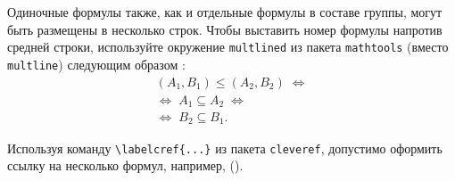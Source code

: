 Одиночные формулы также, как и отдельные формулы в составе группы, могут быть размещены в несколько строк. Чтобы выставить номер формулы напротив средней строки, используйте окружение \verb|multlined| из пакета \verb|mathtools| (вместо \verb|multline|) следующим образом \cite{Ganter1999}:
\begin{equation} %
\label{eq:fConcept-order-G}
\begin{multlined}
(A_1,B_1)\leq (A_2,B_2)\; \Leftrightarrow \\  \Leftrightarrow\; A_1\subseteq A_2\; \Leftrightarrow \\ \Leftrightarrow\; B_2\subseteq B_1. 
\end{multlined}
\end{equation}

	
Используя команду \verb|\labelcref{...}| из пакета \verb|cleveref|, допустимо оформить ссылку на несколько формул, например, ().